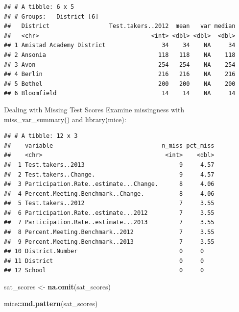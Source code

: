 \documentclass[]{book}
\newenvironment{Shaded}{\begin{snugshade}}{\end{snugshade}}
\newcommand{\KeywordTok}[1]{\textcolor[rgb]{0.13,0.29,0.53}{\textbf{#1}}}
\newcommand{\NormalTok}[1]{#1}
\newcommand{\OperatorTok}[1]{\textcolor[rgb]{0.81,0.36,0.00}{\textbf{#1}}}
\newcommand{\StringTok}[1]{\textcolor[rgb]{0.31,0.60,0.02}{#1}}
\begin{document}
\begin{verbatim}
## # A tibble: 6 x 5
## # Groups:   District [6]
##   District                 Test.takers..2012  mean   var median
##   <chr>                                <int> <dbl> <dbl>  <dbl>
## 1 Amistad Academy District                34    34    NA     34
## 2 Ansonia                                118   118    NA    118
## 3 Avon                                   254   254    NA    254
## 4 Berlin                                 216   216    NA    216
## 5 Bethel                                 200   200    NA    200
## 6 Bloomfield                              14    14    NA     14
\end{verbatim}

Dealing with Missing Test Scores
Examine missingness with miss\_var\_summary() and library(mice):

\begin{Shaded}
\end{Shaded}

\begin{verbatim}
## # A tibble: 12 x 3
##    variable                               n_miss pct_miss
##    <chr>                                   <int>    <dbl>
##  1 Test.takers..2013                           9     4.57
##  2 Test.takers..Change.                        9     4.57
##  3 Participation.Rate..estimate...Change.      8     4.06
##  4 Percent.Meeting.Benchmark..Change.          8     4.06
##  5 Test.takers..2012                           7     3.55
##  6 Participation.Rate..estimate...2012         7     3.55
##  7 Participation.Rate..estimate...2013         7     3.55
##  8 Percent.Meeting.Benchmark..2012             7     3.55
##  9 Percent.Meeting.Benchmark..2013             7     3.55
## 10 District.Number                             0     0   
## 11 District                                    0     0   
## 12 School                                      0     0
\end{verbatim}

\begin{Shaded}
\begin{Highlighting}[]
\NormalTok{sat_scores <-}\StringTok{ }\KeywordTok{na.omit}\NormalTok{(sat_scores)}

\NormalTok{mice}\OperatorTok{::}\KeywordTok{md.pattern}\NormalTok{(sat_scores)}
\end{Highlighting}
\end{Shaded}
\end{document}
